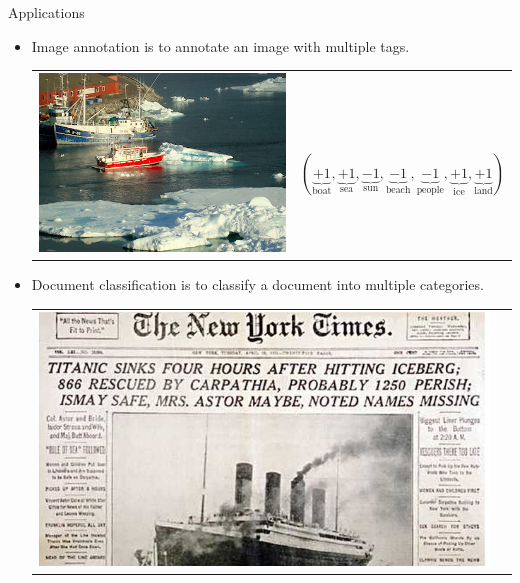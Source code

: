 \documentclass[first=purple,second=dgreen,logo=redexc]{aaltoslides}
\begin{document}
{\begin{frame}{Applications}
	\begin{itemize}
		\item Image annotation is to annotate an image with multiple tags.
		\begin{tabular}{p{3cm}p{10cm}}
        \multirow{2}{*}{\includegraphics[scale = 0.13]{./figures/boatsea.png}} & \\
		& $(\underbrace{+1}_{\text{boat}},\underbrace{+1}_{\text{sea}},\underbrace{-1}_{\text{sun}},\underbrace{-1}_{\text{beach}},\underbrace{-1}_{\text{people}},\underbrace{+1}_{\text{ice}},\underbrace{+1}_{\text{land}})$\\
        \end{tabular}
		\item Document classification is to classify a document into multiple categories.\\
		\begin{tabular}{p{3cm}p{10cm}} 
        \multirow{2}{*}{\includegraphics[scale = 0.13]{./figures/titanic.jpg}} & \\

\end{tabular}
\end{itemize}
\end{frame}}
\end{document}
